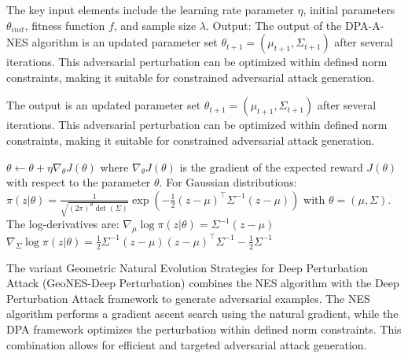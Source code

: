 The key input elements include the learning rate parameter $\eta$, initial parameters $\theta_{init}$, fitness function $f$, and sample size $\lambda$. Output: The output of the DPA-A-NES algorithm is an updated parameter set $\theta_{t+1} = (\mu_{t+1}, \Sigma_{t+1})$ after several iterations. This adversarial perturbation can be optimized within defined norm constraints, making it suitable for constrained adversarial attack generation.

The output is an updated parameter set $\theta_{t+1} = (\mu_{t+1}, \Sigma_{t+1})$ after several iterations. This adversarial perturbation can be optimized within defined norm constraints, making it suitable for constrained adversarial attack generation.

$\theta \leftarrow \theta + \eta \nabla_\theta J(\theta)$
where $\nabla_\theta J(\theta)$ is the gradient of the expected reward $J(\theta)$ with respect to the parameter $\theta$. For Gaussian distributions:
$\pi(z | \theta) = \frac{1}{\sqrt{(2\pi)^d \det(\Sigma)}} \exp \left( -\frac{1}{2} (z - \mu)^\top \Sigma^{-1} (z - \mu) \right)$
with $\theta = (\mu, \Sigma)$. The log-derivatives are:
$\nabla_\mu \log \pi (z | \theta) = \Sigma^{-1} (z - \mu)$
$\nabla_\Sigma \log \pi (z | \theta) = \frac{1}{2} \Sigma^{-1} (z - \mu) (z - \mu)^\top \Sigma^{-1} - \frac{1}{2} \Sigma^{-1}$

The variant Geometric Natural Evolution Strategies for Deep Perturbation Attack (GeoNES-Deep Perturbation) combines the NES algorithm with the Deep Perturbation Attack framework to generate adversarial examples. The NES algorithm performs a gradient ascent search using the natural gradient, while the DPA framework optimizes the perturbation within defined norm constraints. This combination allows for efficient and targeted adversarial attack generation.